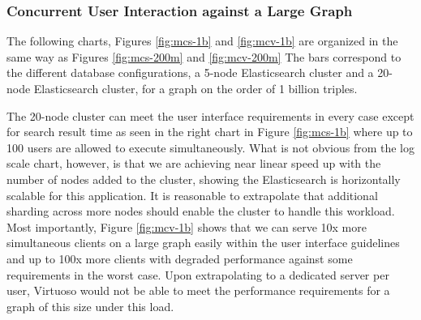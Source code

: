 \subsubsection{Concurrent User Interaction against a Large Graph}
The following charts, Figures \ref{fig:mcs-1b} and \ref{fig:mcv-1b} are organized in the same way as Figures \ref{fig:mcs-200m} and \ref{fig:mcv-200m} 
The bars correspond to the different database configurations, a 5-node Elasticsearch cluster and a 20-node Elasticsearch cluster, for a graph on the order of 1 billion triples. 

The 20-node cluster can meet the user interface requirements in every case except for search result time as seen in the right chart in Figure \ref{fig:mcs-1b} where up to 100 users are allowed to execute simultaneously.  
What is not obvious from the log scale chart, however, is that we are achieving near linear speed up with the number of nodes added to the cluster, showing the Elasticsearch is horizontally scalable for this application.
It is reasonable to extrapolate that additional sharding across more nodes should enable the cluster to handle this workload.
Most importantly, Figure \ref{fig:mcv-1b} shows that we can serve 10x more simultaneous clients on a large graph easily within the user interface guidelines and up to 100x more clients with degraded performance against some requirements in the worst case.  
Upon extrapolating to a dedicated server per user, Virtuoso would not be able to meet the performance requirements for a graph of this size under this load.
